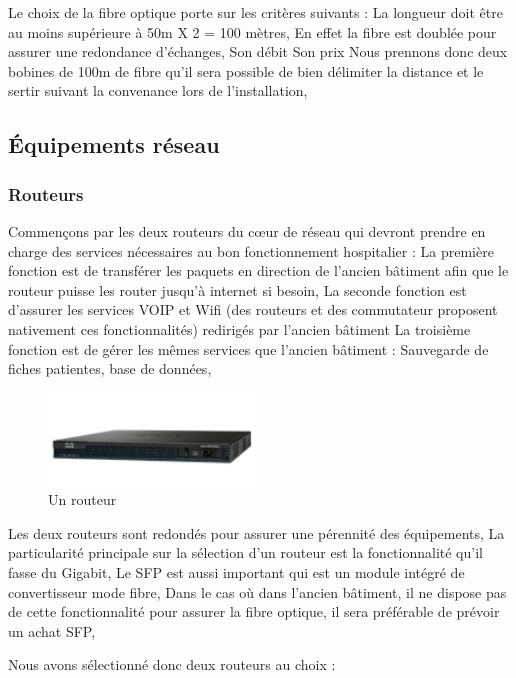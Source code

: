 Le choix de la fibre optique porte sur les critères suivants :
La longueur doit être au moins supérieure à 50m X 2 = 100 mètres, En effet la fibre est doublée pour assurer une redondance d'échanges,
Son débit
Son prix
Nous prennons donc deux bobines de 100m de fibre qu'il sera possible de bien délimiter la distance et le sertir suivant la convenance lors de l'installation,


\subsection{Équipements réseau}

\subsubsection{Routeurs}

Commençons par les deux routeurs du cœur de réseau qui devront prendre en charge des services nécessaires au bon fonctionnement hospitalier :
La première fonction est de transférer les paquets en direction de l'ancien bâtiment afin que le routeur puisse les router jusqu'à internet si besoin,
La seconde fonction est d'assurer les services VOIP et Wifi (des routeurs et des commutateur proposent nativement ces fonctionnalités) redirigés par l'ancien bâtiment
La troisième fonction est de gérer les mêmes services que l'ancien bâtiment : Sauvegarde de fiches patientes, base de données,

\begin{figure}
    \center
    \includegraphics[width=0.5\textwidth]{./images/7.png}
    \caption{Un routeur}
\end{figure}

Les deux routeurs sont redondés pour assurer une pérennité des équipements,
La particularité principale sur la sélection d'un routeur est la fonctionnalité qu'il fasse du Gigabit,
Le SFP est aussi important qui est un module intégré de convertisseur mode fibre, Dans le cas où dans l'ancien bâtiment, il ne dispose pas de cette fonctionnalité pour assurer la fibre optique, il sera préférable de prévoir un achat SFP,

Nous avons sélectionné donc deux routeurs au choix :



